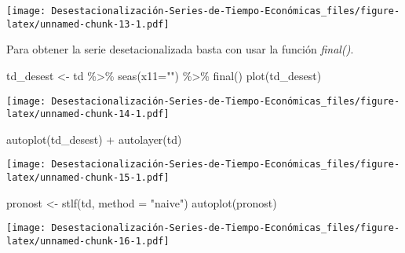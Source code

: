 \documentclass[
]{article}
\newenvironment{Shaded}{\begin{snugshade}}{\end{snugshade}}
\newcommand{\AttributeTok}[1]{\textcolor[rgb]{0.77,0.63,0.00}{#1}}
\newcommand{\FunctionTok}[1]{\textcolor[rgb]{0.00,0.00,0.00}{#1}}
\newcommand{\NormalTok}[1]{#1}
\newcommand{\OtherTok}[1]{\textcolor[rgb]{0.56,0.35,0.01}{#1}}
\newcommand{\SpecialCharTok}[1]{\textcolor[rgb]{0.00,0.00,0.00}{#1}}
\newcommand{\StringTok}[1]{\textcolor[rgb]{0.31,0.60,0.02}{#1}}
\begin{document}
\texttt{[image: Desestacionalización-Series-de-Tiempo-Económicas\_files/figure-latex/unnamed-chunk-13-1.pdf]}

Para obtener la serie desetacionalizada basta con usar la función
\emph{final()}.

\begin{Shaded}
\begin{Highlighting}[]
\NormalTok{td\_desest }\OtherTok{\textless{}{-}}\NormalTok{ td }\SpecialCharTok{\%\textgreater{}\%} \FunctionTok{seas}\NormalTok{(}\AttributeTok{x11=}\StringTok{""}\NormalTok{) }\SpecialCharTok{\%\textgreater{}\%} \FunctionTok{final}\NormalTok{()}
\FunctionTok{plot}\NormalTok{(td\_desest)}
\end{Highlighting}
\end{Shaded}

\texttt{[image: Desestacionalización-Series-de-Tiempo-Económicas\_files/figure-latex/unnamed-chunk-14-1.pdf]}

\begin{Shaded}
\begin{Highlighting}[]
\FunctionTok{autoplot}\NormalTok{(td\_desest) }\SpecialCharTok{+} \FunctionTok{autolayer}\NormalTok{(td)}
\end{Highlighting}
\end{Shaded}

\texttt{[image: Desestacionalización-Series-de-Tiempo-Económicas\_files/figure-latex/unnamed-chunk-15-1.pdf]}

\begin{Shaded}
\begin{Highlighting}[]
\NormalTok{pronost }\OtherTok{\textless{}{-}} \FunctionTok{stlf}\NormalTok{(td, }\AttributeTok{method =} \StringTok{"naive"}\NormalTok{)}
\FunctionTok{autoplot}\NormalTok{(pronost)}
\end{Highlighting}
\end{Shaded}

\texttt{[image: Desestacionalización-Series-de-Tiempo-Económicas\_files/figure-latex/unnamed-chunk-16-1.pdf]}
\end{document}
